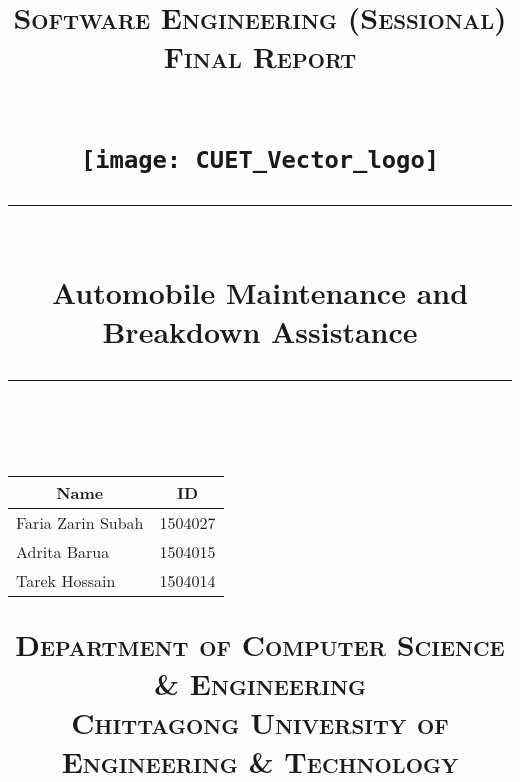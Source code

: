 \title{	
	\date{}
	\normalfont\Large
	\textsc{Software Engineering (Sessional) Final Report }\\ %
	\textsc{}\\ %
	
    \begin{figure}[h] %
        \centering
        \texttt{[image: CUET\_Vector\_logo]} %
    \end{figure}
    
	\vspace{25pt} %
	\rule{\linewidth}{2pt}\\ %
	\vspace{20pt} %
	{\huge Automobile Maintenance and Breakdown Assistance}\\ %
	\rule{\linewidth}{2pt}\\ %
	\vspace{110pt} %
	\centering	
	\centering
	\begin{tabular}{l|l}
	\multicolumn{1}{c|}{Name} & \multicolumn{1}{c}{ID} \\ \hline
	Faria Zarin Subah        & 1504027                \\ \hline
	Adrita Barua       & 1504015               \\ \hline
	Tarek Hossain          & 1504014               
	\end{tabular}
	
	\vspace{105pt} %
	\normalfont\Large
	\textsc{Department of Computer Science \& Engineering}\\
	
	\normalfont\Large
	\textsc{Chittagong University of Engineering \& Technology}\\
}
